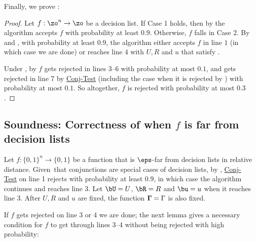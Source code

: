 \documentclass[11pt]{article}
\theoremstyle{definition}
\begin{document}
Finally, we prove :
\begin{proof}
    Let $f:\zo^n \to \zo$ be a decision list. If Case 1 holds, then by  the algorithm accepts $f$ with probability at least $0.9$. Otherwise, $f$ falls in Case 2. By  and ,
  with probability at least $0.9$, the algorithm either accepts
  $f$ in line $1$ (in which case we are done) or reaches line 4 with $U,R$ and $u$
  that satisfy . 

Under , by  $f$ gets rejected in lines {3--6}
with probability at most $0.1$,
and gets rejected in line {7}
by \hyperlink{Algorithm2}{\sc Conj-Test} (including the case when it is rejected
  by ) with probability at most $0.1$.
So altogether,   $f$ is rejected with probability at most $0.3$. \end{proof}



\subsection{Soundness: 
 Correctness of  when $f$ is far from decision lists}\label{sec:soundness}

Let $f:\{0,1\}^n\rightarrow \{0,1\}$ be a function that is $\eps$-far from
  decision lists in relative distance.
Given~that conjunctions are special cases of 
  decision lists,
  by , \hyperlink{Algorithm2}{\sc Conj-Test} 
    on line 1 rejects with probability at least $0.9$, in which case the algorithm continues 
    and reaches line 3.
Let $\bU=U$, $\bR=R$ and $\bu=u$ when it reaches line 3. After $U,R$ and $u$
  are fixed, the function  
  $\mathbf{\Gamma}=\Gamma$ is also fixed.



If $f$ gets rejected on line 3 or 4 we are done;
  the next lemma gives a necessary condition
  for $f$ to get through lines 3--4 without 
  being rejected {with high probability}:
\end{document}

